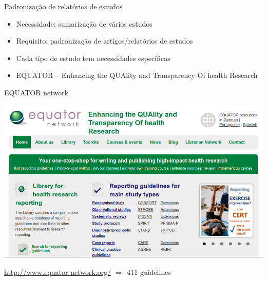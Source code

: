 \documentclass{beamer}
\begin{document}
\begin{frame}{Padronização de relatórios de estudos}
  \begin{itemize}
    \small
  \item Necessidade: sumarização de vários estudos
  \bigskip
  \item Requisito: padronização de artigos/relatórios de estudos
    \bigskip
  \item Cada tipo de estudo tem necessidades específicas
    \bigskip
    \footnotesize
  \item EQUATOR -- {\scriptsize Enhancing the QUAlity and Transparency Of health Research}
  \end{itemize}
\end{frame}

\begin{frame}{EQUATOR network}
  \begin{center}
    \includegraphics[width=\textwidth]{Metodos/equator-net}

    \bigskip
    \tiny
    \url{http://www.equator-network.org/} $\Rightarrow$ 411 guidelines
  \end{center}
\end{frame}
\end{document}
